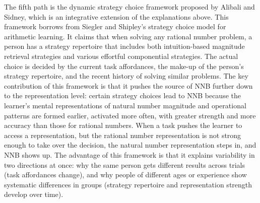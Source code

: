 The fifth path is the dynamic strategy choice framework proposed by Alibali and Sidney\cite{alibali2015}, which is an integrative extension of the explanations above. This framework borrows from Siegler and Shipley's\cite{siegler1995} strategy choice model for arithmetic learning. It claims that when solving any rational number problem, a person has a strategy repertoire that includes both intuition-based magnitude retrieval strategies and various effortful componential strategies. The actual choice is decided by the current task affordances, the make-up of the person's strategy repertoire, and the recent history of solving similar problems. The key contribution of this framework is that it pushes the source of NNB further down to the representation level: certain strategy choices lead to NNB because the learner's mental representations of natural number magnitude and operational patterns are formed earlier, activated more often, with greater strength and more accuracy than those for rational numbers\cite{dehaene2009, siegler2011}. When a task pushes the learner to access a representation, but the rational number representation is not strong enough to take over the decision, the natural number representation steps in, and NNB shows up. The advantage of this framework is that it explains variability in two directions at once: why the same person gets different results across trials (task affordances change), and why people of different ages or experience show systematic differences in groups (strategy repertoire and representation strength develop over time).

